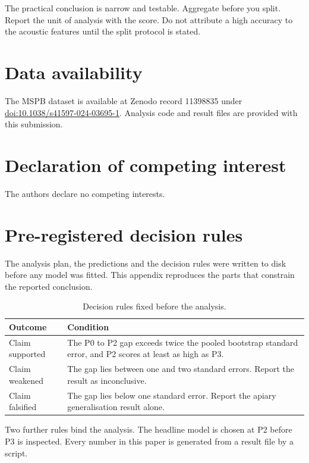 ﻿\documentclass[review,12pt]{elsarticle}
\begin{document}
The practical conclusion is narrow and testable.
Aggregate before you split.
Report the unit of analysis with the score.
Do not attribute a high accuracy to the acoustic features until the split
protocol is stated.

\section*{Data availability}

The MSPB dataset is available at Zenodo record 11398835 under
\href{https://doi.org/10.1038/s41597-024-03695-1}{doi:10.1038/s41597-024-03695-1}.
Analysis code and result files are provided with this submission.

\section*{Declaration of competing interest}

The authors declare no competing interests.

\appendix

\section{Pre-registered decision rules}
\label{app:prereg}

The analysis plan, the predictions and the decision rules were written to disk
before any model was fitted.
This appendix reproduces the parts that constrain the reported conclusion.

\begin{table}[h]
\centering
\small
\caption{Decision rules fixed before the analysis.}
\label{tab:rules}
\begin{tabular}{@{}p{}p{}@{}}
\toprule
Outcome & Condition \\
\midrule
Claim supported & The P0 to P2 gap exceeds twice the pooled bootstrap standard
error, and P2 scores at least as high as P3. \\
Claim weakened & The gap lies between one and two standard errors. Report the
result as inconclusive. \\
Claim falsified & The gap lies below one standard error. Report the apiary
generalisation result alone. \\
\bottomrule
\end{tabular}
\end{table}

Two further rules bind the analysis.
The headline model is chosen at P2 before P3 is inspected.
Every number in this paper is generated from a result file by a script.
\end{document}
